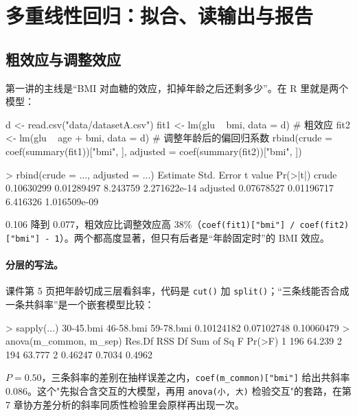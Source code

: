 \section{多重线性回归：拟合、读输出与报告}

\subsection{粗效应与调整效应}
第一讲的主线是“BMI 对血糖的效应，扣掉年龄之后还剩多少”。在 R 里就是两个模型：

\begin{RCode}[R · 两个模型]
d <- read.csv("data/datasetA.csv")
fit1 <- lm(glu ~ bmi, data = d)          # 粗效应
fit2 <- lm(glu ~ age + bmi, data = d)    # 调整年龄后的偏回归系数
rbind(crude    = coef(summary(fit1))["bmi", ],
      adjusted = coef(summary(fit2))["bmi", ])
\end{RCode}
\begin{ROut}
> rbind(crude = ..., adjusted = ...)
           Estimate Std. Error  t value     Pr(>|t|)
crude    0.10630299 0.01289497 8.243759 2.271622e-14
adjusted 0.07678527 0.01196717 6.416326 1.016509e-09
\end{ROut}
0.106 降到 0.077，粗效应比调整效应高 38\%（\Verb|coef(fit1)["bmi"] / coef(fit2)["bmi"] - 1|）。两个都高度显著，但只有后者是“年龄固定时”的 BMI 效应。

\paragraph{分层的写法。}课件第 5 页把年龄切成三层看斜率，代码是 \Verb|cut()| 加 \Verb|split()|；“三条线能否合成一条共斜率”是一个嵌套模型比较：

\begin{ROut}
> sapply(...)
 30-45.bmi  46-58.bmi  59-78.bmi
0.10124182 0.07102748 0.10060479
> anova(m_common, m_sep)
  Res.Df    RSS Df Sum of Sq      F Pr(>F)
1    196 64.239
2    194 63.777  2   0.46247 0.7034 0.4962
\end{ROut}
$P = 0.50$，三条斜率的差别在抽样误差之内，\Verb|coef(m_common)["bmi"]| 给出共斜率 0.086。这个"先拟合含交互的大模型，再用 \Verb|anova(小, 大)| 检验交互"的套路，在第 7 章协方差分析的斜率同质性检验里会原样再出现一次。

